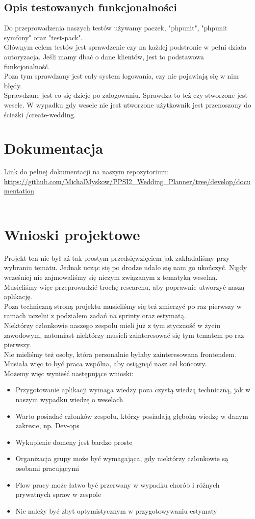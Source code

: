 \documentclass{article}
\begin{document}
\subsection{Opis testowanych funkcjonalności}
Do przeprowadzenia naszych testów używamy paczek, "phpunit", "phpunit symfony" oraz "test-pack".\\
Głównym celem testów jest sprawdzenie czy na każdej podstronie w pełni działa autoryzacja. Jeśli mamy dbać o dane klientów, jest to podstawowa funkcjonalność. \\
Poza tym sprawdzany jest cały system logowania, czy nie pojawiają się w nim błędy. \\
Sprawdzane jest co się dzieje po zalogowaniu. Sprawdza to też czy stworzone jest wesele. W wypadku gdy wesele nie jest utworzone użytkownik jest przenoszony do ścieżki /create-wedding.

\section{Dokumentacja}
Link do pełnej dokumentacji na naszym repozytorium: 
\url{https://github.com/MichalMyskow/PPSI2_Wedding_Planner/tree/develop/documentation}\\\\
\section{Wnioski projektowe}
Projekt ten nie był aż tak prostym przedsięwzięciem jak zakładaliśmy przy wybraniu tematu. Jednak ucząc się po drodze udało się nam go ukończyć. Nigdy wcześniej nie zajmowaliśmy się niczym związanym z tematyką weselną. Musieliśmy więc przeprowadzić trochę researchu, aby poprawnie utworzyć naszą aplikację.\\
Poza techniczną stroną projektu musieliśmy się też zmierzyć po raz pierwszy w ramach uczelni z podziałem zadań na sprinty oraz estymatą.\\
Niektórzy członkowie naszego zespołu mieli już z tym styczność w życiu zawodowym, natomiast niektórzy musieli zainteresować się tym tematem po raz pierwszy.\\
Nie mieliśmy też osoby, która personalnie byłaby zainteresowana frontendem. Musiała więc to być praca wspólna, aby osiągnąć nasz cel końcowy.\\
Możemy więc wynieść następujące wnioski:\\
\begin{itemize}
\item Przygotowanie aplikacji wymaga wiedzy poza czystą wiedzą techniczną, jak w naszym wypadku wiedzę o weselach
\item Warto posiadać członków zespołu, którzy posiadają głęboką wiedzę w danym zakresie, np. Dev-ops
\item Wykupienie domeny jest bardzo proste
\item Organizacja grupy może być wymagająca, gdy niektórzy członkowie są osobami pracującymi
\item Flow pracy może łatwo być przerwany w wypadku chorób i różnych prywatnych spraw w zespole
\item Nie należy być zbyt optymistycznym w przygotowywaniu estymaty
\end{itemize}
\end{document}

